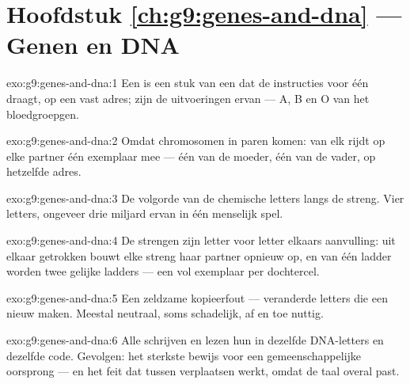 \section*{Hoofdstuk \ref{ch:g9:genes-and-dna} --- Genen en DNA}

\begin{solution}{exo:g9:genes-and-dna:1}
Een  is een stuk van een  dat de instructies voor
één  draagt, op een vast adres;  zijn de
uitvoeringen ervan --- A, B en O van het bloedgroepgen.
\end{solution}

\begin{solution}{exo:g9:genes-and-dna:2}
Omdat chromosomen in paren komen: van elk  rijdt op elke
partner één exemplaar mee --- één van de moeder, één van de
vader, op hetzelfde adres.
\end{solution}

\begin{solution}{exo:g9:genes-and-dna:3}
De volgorde van de chemische letters langs de streng. Vier
 letters, ongeveer drie miljard ervan in één menselijk
spel.
\end{solution}

\begin{solution}{exo:g9:genes-and-dna:4}
De strengen zijn letter voor letter elkaars aanvulling: uit
elkaar getrokken bouwt elke streng haar partner opnieuw op, en
van één ladder worden twee gelijke ladders --- een vol exemplaar
per dochtercel.
\end{solution}

\begin{solution}{exo:g9:genes-and-dna:5}
Een zeldzame kopieerfout --- veranderde letters die een nieuw
 maken. Meestal neutraal, soms schadelijk, af en toe
nuttig.
\end{solution}

\begin{solution}{exo:g9:genes-and-dna:6}
Alle  schrijven en lezen hun  in dezelfde
DNA-letters en dezelfde code. Gevolgen: het sterkste bewijs voor
een gemeenschappelijke oorsprong --- en het feit dat 
tussen  verplaatsen werkt, omdat de taal overal past.
\end{solution}

